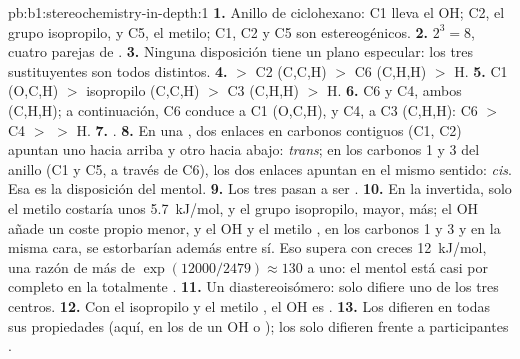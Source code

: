 \begin{solution}{pb:b1:stereochemistry-in-depth:1}
\textbf{1.} Anillo de ciclohexano: C1 lleva el OH; C2, el grupo
isopropilo, y C5, el metilo; C1, C2 y C5 son estereogénicos.
\textbf{2.} $2^3 = 8$, cuatro parejas de .
\textbf{3.} Ninguna disposición tiene un plano especular: los tres
sustituyentes son todos distintos.
\textbf{4.}  $>$ C2 (C,C,H) $>$ C6 (C,H,H) $>$ H.
\textbf{5.} C1 (O,C,H) $>$ isopropilo (C,C,H) $>$ C3 (C,H,H) $>$ H.
\textbf{6.} C6 y C4, ambos (C,H,H); a continuación, C6 conduce a C1
(O,C,H), y C4, a C3
(C,H,H): C6 $>$ C4 $>$  $>$ H.
\textbf{7.} .
\textbf{8.} En una , dos enlaces  en carbonos contiguos
(C1, C2) apuntan uno hacia arriba y otro hacia abajo: \textit{trans}; en
los carbonos 1 y 3 del anillo (C1 y C5, a través de C6), los dos enlaces
 apuntan en el mismo sentido: \textit{cis}. Esa es la
disposición del mentol.
\textbf{9.} Los tres pasan a ser .
\textbf{10.} En la  invertida, solo el metilo costaría unos
\qty{5.7}{kJ/mol}, y el grupo isopropilo, mayor, más; el OH añade un coste
propio menor, y el OH y el metilo , en los carbonos 1 y 3 y en la
misma cara, se estorbarían además entre sí. Eso supera con creces
\qty{12}{kJ/mol}, una razón de más de $\exp(12000/2479) \approx 130$ a
uno: el mentol está casi por completo en la  totalmente .
\textbf{11.} Un diastereoisómero: solo difiere uno de los tres centros.
\textbf{12.} Con el isopropilo y el metilo , el OH es .
\textbf{13.} Los  difieren en todas sus propiedades (aquí,
en los  de un OH  o ); los
 solo difieren frente a participantes .

\end{solution}
